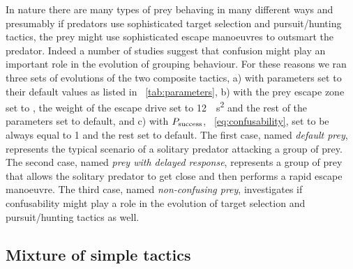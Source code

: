 In nature there are many types of prey behaving in many different ways and presumably if predators use sophisticated target selection and pursuit/hunting tactics, the prey might use sophisticated escape manoeuvres to outsmart the predator. Indeed a number of studies \cite{kunz2006prey,nishimura2002predator,olson2013predator,zheng2005behavior} suggest that confusion might play an important role in the evolution of grouping behaviour. For these reasons we ran three sets of evolutions of the two composite tactics, a) with parameters set to their default values as listed in \tablename~\ref{tab:parameters}, b) with the prey escape zone set to , the weight of the escape drive set to \SI{12}{\per\second\squared} and the rest of the parameters set to default, and c) with $P_\textnormal{success}$, \eq~\eqref{eq:confusability}, set to be always equal to 1 and the rest set to default. The first case, named \emph{default prey}, represents the typical scenario of a solitary predator attacking a group of prey. The second case, named \emph{prey with delayed response}, represents a group of prey that allows the solitary predator to get close and then performs a rapid escape manoeuvre. The third case, named \emph{non-confusing prey}, investigates if confusability might play a role in the evolution of target selection and pursuit/hunting tactics as well.

\subsection{Mixture of simple tactics}
\label{sec:mix}

